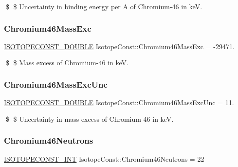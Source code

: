\$ \$ Uncertainty in binding energy per A of Chromium-\/46 in keV. \mbox{\label{group___isotope_const-_chromium-_cr46_ga8198d77728825d12ae8d3a9a1bd065a8}} 
\subsubsection{\texorpdfstring{Chromium46\+Mass\+Exc}{Chromium46MassExc}}
{\footnotesize\ttfamily \mbox{\hyperlink{group___isotope_const-_macros_ga8f45a7272ce02c0b4c65c44636ed719a}{I\+S\+O\+T\+O\+P\+E\+C\+O\+N\+S\+T\+\_\+\+D\+O\+U\+B\+LE}} Isotope\+Const\+::\+Chromium46\+Mass\+Exc = -\/29471.}

\$ \$ Mass excess of Chromium-\/46 in keV. \mbox{\label{group___isotope_const-_chromium-_cr46_gad22454293763887fb4af868027c31293}} 
\subsubsection{\texorpdfstring{Chromium46\+Mass\+Exc\+Unc}{Chromium46MassExcUnc}}
{\footnotesize\ttfamily \mbox{\hyperlink{group___isotope_const-_macros_ga8f45a7272ce02c0b4c65c44636ed719a}{I\+S\+O\+T\+O\+P\+E\+C\+O\+N\+S\+T\+\_\+\+D\+O\+U\+B\+LE}} Isotope\+Const\+::\+Chromium46\+Mass\+Exc\+Unc = 11.}

\$ \$ Uncertainty in mass excess of Chromium-\/46 in keV. \mbox{\label{group___isotope_const-_chromium-_cr46_ga71ba0f21ccbe300cd00c4c3d405aaef0}} 
\subsubsection{\texorpdfstring{Chromium46\+Neutrons}{Chromium46Neutrons}}
{\footnotesize\ttfamily \mbox{\hyperlink{group___isotope_const-_macros_ga5f18360b3e99483a35c32d789e62621c}{I\+S\+O\+T\+O\+P\+E\+C\+O\+N\+S\+T\+\_\+\+I\+NT}} Isotope\+Const\+::\+Chromium46\+Neutrons = 22}

